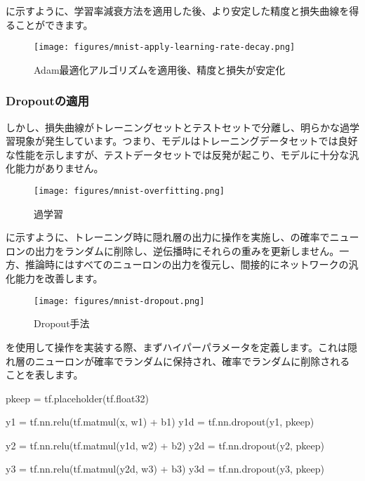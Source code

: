 \begin{content}
\begin{content}
に示すように、学習率減衰方法を適用した後、より安定した精度と損失曲線を得ることができます。

\begin{figure}[H]
\centering
\texttt{[image: figures/mnist-apply-learning-rate-decay.png]}
\caption{Adam最適化アルゴリズムを適用後、精度と損失が安定化}
 \label{fig:mnist-apply-learning-rate-decay}
\end{figure}

\subsubsection{Dropoutの適用}

しかし、損失曲線がトレーニングセットとテストセットで分離し、明らかな過学習現象が発生しています。つまり、モデルはトレーニングデータセットでは良好な性能を示しますが、テストデータセットでは反発が起こり、モデルに十分な汎化能力がありません。

\begin{figure}[H]
\centering
\texttt{[image: figures/mnist-overfitting.png]}
\caption{過学習}
 \label{fig:mnist-overfitting}
\end{figure}

に示すように、トレーニング時に隠れ層の出力に操作を実施し、の確率でニューロンの出力をランダムに削除し、逆伝播時にそれらの重みを更新しません。一方、推論時にはすべてのニューロンの出力を復元し、間接的にネットワークの汎化能力を改善します。

\begin{figure}[H]
\centering
\texttt{[image: figures/mnist-dropout.png]}
\caption{Dropout手法}
 \label{fig:mnist-dropout}
\end{figure}

\tf{}を使用して操作を実装する際、まずハイパーパラメータを定義します。これは隠れ層のニューロンが確率でランダムに保持され、確率でランダムに削除されることを表します。

\begin{leftbar}
\begin{python}
pkeep = tf.placeholder(tf.float32)

y1 = tf.nn.relu(tf.matmul(x,  w1) + b1)
y1d = tf.nn.dropout(y1, pkeep)

y2 = tf.nn.relu(tf.matmul(y1d, w2) + b2)
y2d = tf.nn.dropout(y2, pkeep)

y3 = tf.nn.relu(tf.matmul(y2d, w3) + b3)
y3d = tf.nn.dropout(y3, pkeep)


\end{python}
\end{leftbar}
\end{content}
\end{content}
